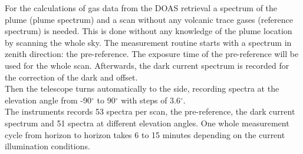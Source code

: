 		For the calculations of gas data from the DOAS retrieval a spectrum of the plume (plume spectrum) and a scan without any volcanic trace gases (reference spectrum) is needed.  This is done without any knowledge of the plume location by scanning the whole sky. 
		The measurement routine starts with a spectrum in zenith direction: the pre-reference. The exposure time of the pre-reference will be used for the whole scan.
		Afterwards, the dark current spectrum is recorded for the correction of the dark and offset.\\
		Then the telescope turns automatically to the side, recording spectra at the elevation angle from -90$^{\circ}$ to 90$^{\circ}$ with steps of 3.6$^{\circ}$. \\
		The instruments records 53 spectra per scan, the pre-reference, the dark current spectrum and 51 spectra at different elevation angles.
		One whole measurement cycle from horizon to horizon takes 6 to 15 minutes depending on the current illumination conditions.
		
		
